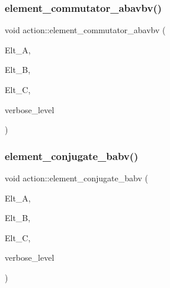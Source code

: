 \subsubsection{\texorpdfstring{element\+\_\+commutator\+\_\+abavbv()}{element\_commutator\_abavbv()}}
{\footnotesize\ttfamily void action\+::element\+\_\+commutator\+\_\+abavbv (\begin{DoxyParamCaption}\item[{\mbox{\hyperlink{galois_8h_a09fddde158a3a20bd2dcadb609de11dc}{I\+NT}} $\ast$}]{Elt\+\_\+A,  }\item[{\mbox{\hyperlink{galois_8h_a09fddde158a3a20bd2dcadb609de11dc}{I\+NT}} $\ast$}]{Elt\+\_\+B,  }\item[{\mbox{\hyperlink{galois_8h_a09fddde158a3a20bd2dcadb609de11dc}{I\+NT}} $\ast$}]{Elt\+\_\+C,  }\item[{\mbox{\hyperlink{galois_8h_a09fddde158a3a20bd2dcadb609de11dc}{I\+NT}}}]{verbose\+\_\+level }\end{DoxyParamCaption})}

\mbox{\label{classaction_a07f33ef48401c9c90b06eba3f5fe8ced}} 
\subsubsection{\texorpdfstring{element\+\_\+conjugate\+\_\+babv()}{element\_conjugate\_babv()}}
{\footnotesize\ttfamily void action\+::element\+\_\+conjugate\+\_\+babv (\begin{DoxyParamCaption}\item[{\mbox{\hyperlink{galois_8h_a09fddde158a3a20bd2dcadb609de11dc}{I\+NT}} $\ast$}]{Elt\+\_\+A,  }\item[{\mbox{\hyperlink{galois_8h_a09fddde158a3a20bd2dcadb609de11dc}{I\+NT}} $\ast$}]{Elt\+\_\+B,  }\item[{\mbox{\hyperlink{galois_8h_a09fddde158a3a20bd2dcadb609de11dc}{I\+NT}} $\ast$}]{Elt\+\_\+C,  }\item[{\mbox{\hyperlink{galois_8h_a09fddde158a3a20bd2dcadb609de11dc}{I\+NT}}}]{verbose\+\_\+level }\end{DoxyParamCaption})}

\mbox{\label{classaction_a120a6a559d089e5f70c8d08337c9eda1}} 
